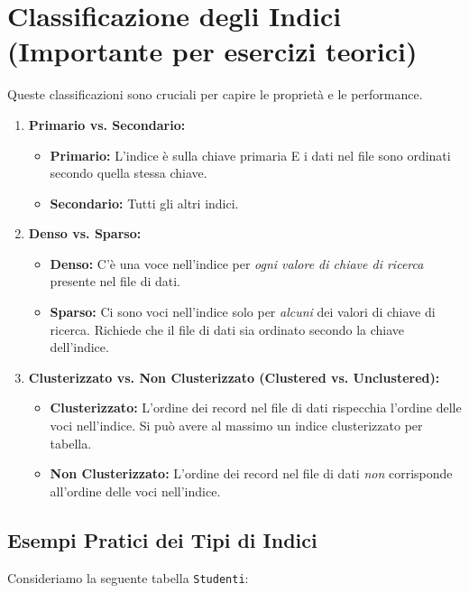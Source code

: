 \section{Classificazione degli Indici (Importante per esercizi teorici)}
Queste classificazioni sono cruciali per capire le proprietà e le performance.
\begin{enumerate}
    \item \textbf{Primario vs. Secondario:}
    \begin{itemize}
        \item \textbf{Primario:} L'indice è sulla chiave primaria E i dati nel file sono ordinati secondo quella stessa chiave.
        \item \textbf{Secondario:} Tutti gli altri indici.
    \end{itemize}

    \item \textbf{Denso vs. Sparso:}
    \begin{itemize}
        \item \textbf{Denso:} C'è una voce nell'indice per \textit{ogni valore di chiave di ricerca} presente nel file di dati.
        \item \textbf{Sparso:} Ci sono voci nell'indice solo per \textit{alcuni} dei valori di chiave di ricerca. Richiede che il file di dati sia ordinato secondo la chiave dell'indice.
    \end{itemize}

    \item \textbf{Clusterizzato vs. Non Clusterizzato (Clustered vs. Unclustered):}
    \begin{itemize}
        \item \textbf{Clusterizzato:} L'ordine dei record nel file di dati rispecchia l'ordine delle voci nell'indice. Si può avere al massimo un indice clusterizzato per tabella.
        \item \textbf{Non Clusterizzato:} L'ordine dei record nel file di dati \textit{non} corrisponde all'ordine delle voci nell'indice.
    \end{itemize}
\end{enumerate}

\subsection{Esempi Pratici dei Tipi di Indici}
Consideriamo la seguente tabella \texttt{Studenti}:


